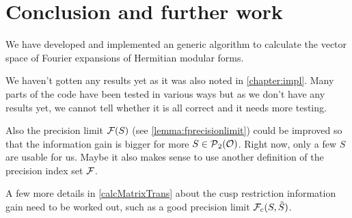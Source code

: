 
\section{Conclusion and further work}
\label{chapter:conclusion}

We have developed and implemented an generic algorithm to calculate the vector space of Fourier expansions of Hermitian modular forms.

We haven't gotten any results yet as it was also noted in \cref{chapter:impl}. Many parts of the code have been tested in various ways but as we don't have any results yet, we cannot tell whether it is all correct and it needs more testing.

Also the precision limit $\mathcal{F}(S)$ (see \cref{lemma:fprecisionlimit}) could be improved so that the information gain is bigger for more $S \in \operatorname{\mathcal{P}}_2(\mathcal{O})$. Right now, only a few $S$ are usable for us. Maybe it also makes sense to use another definition of the precision index set $\mathcal{F}$.

A few more details in \cref{calcMatrixTrans} about the cusp restriction information gain need to be worked out, such as a good precision limit $\mathcal{F}_c(S,\tilde{S})$.
